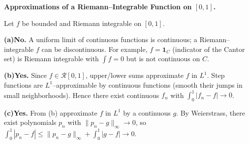 \begin{problem}[CP-II-0189]
\label{prob:cp-ii-0189}
\textbf{Approximations of a Riemann--Integrable Function on $[0,1]$.}

\hspace*{1.5em}Let $f$ be bounded and Riemann integrable on $[0,1]$.

	\par\smallskip\noindent\textbf{(a)}\quad \textbf{No.} A uniform limit of continuous functions is continuous; a Riemann--integrable $f$ can be discontinuous.
	For example, $f=\mathbf 1_C$ (indicator of the Cantor set) is Riemann integrable with $\int f=0$ but is not continuous on $C$.
	\par\smallskip\noindent\textbf{(b)}\quad \textbf{Yes.} Since $f\in\mathcal R[0,1]$, upper/lower sums approximate $f$ in $L^1$. Step functions are $L^1$--approximable by continuous functions (smooth their jumps in small neighborhoods). Hence there exist continuous $f_n$ with $\int_0^1|f_n-f|\to0$.
	\par\smallskip\noindent\textbf{(c)}\quad \textbf{Yes.} From (b) approximate $f$ in $L^1$ by a continuous $g$. By Weierstrass, there exist polynomials $p_n$ with $\|p_n-g\|_\infty\to0$, so $\int_0^1|p_n-f|\le\|p_n-g\|_\infty+\int_0^1|g-f|\to0$.

\bigskip
\end{problem}

